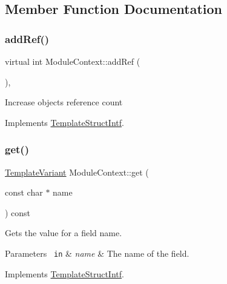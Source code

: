 \subsection{Member Function Documentation}
\mbox{\label{class_module_context_a356f888bf1ecbd08dd2a6b4a7313178e}} 
\subsubsection{\texorpdfstring{addRef()}{addRef()}}
{\footnotesize\ttfamily virtual int Module\+Context\+::add\+Ref (\begin{DoxyParamCaption}{ }\end{DoxyParamCaption})\hspace{0.3cm}{\ttfamily [inline]}, {\ttfamily [virtual]}}

Increase object\textquotesingle{}s reference count 

Implements \mbox{\hyperlink{class_template_struct_intf_a05fe97ad47633beb326f69686faed581}{Template\+Struct\+Intf}}.

\mbox{\label{class_module_context_a230bfe9c78e887904b8eb372bb2b59fd}} 
\subsubsection{\texorpdfstring{get()}{get()}}
{\footnotesize\ttfamily \mbox{\hyperlink{class_template_variant}{Template\+Variant}} Module\+Context\+::get (\begin{DoxyParamCaption}\item[{const char $\ast$}]{name }\end{DoxyParamCaption}) const\hspace{0.3cm}{\ttfamily [virtual]}}

Gets the value for a field name. 
\begin{DoxyParams}[1]{Parameters}
\mbox{\texttt{ in}}  & {\em name} & The name of the field. \\
\hline
\end{DoxyParams}


Implements \mbox{\hyperlink{class_template_struct_intf_a3d610cb81b4adbb531ebed3aa3d09b51}{Template\+Struct\+Intf}}.

\mbox{\label{class_module_context_aae936bd6b861311eca3bf960e0612348}} 

